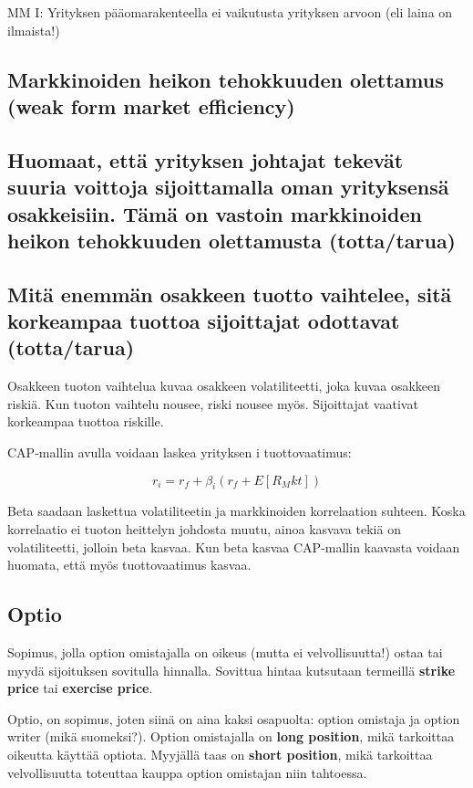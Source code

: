 \documentclass[a4paper]{article}
\begin{document}
MM I: Yrityksen pääomarakenteella ei vaikutusta yrityksen arvoon (eli laina on ilmaista!)



\subsection{Markkinoiden heikon tehokkuuden olettamus (weak form market efficiency)}

\subsection{Huomaat, että yrityksen johtajat tekevät suuria voittoja sijoittamalla oman yrityksensä osakkeisiin. Tämä on vastoin markkinoiden heikon tehokkuuden olettamusta (totta/tarua)}

\subsection{Mitä enemmän osakkeen tuotto vaihtelee, sitä korkeampaa tuottoa sijoittajat odottavat (totta/tarua)}

Osakkeen tuoton vaihtelua kuvaa osakkeen volatiliteetti, joka kuvaa osakkeen riskiä. Kun tuoton vaihtelu nousee, riski nousee myös. Sijoittajat vaativat korkeampaa tuottoa riskille.

CAP-mallin avulla voidaan laskea yrityksen i tuottovaatimus:

\[
    r_i = r_f + \beta_i (r_f + E[R_Mkt])
\]

Beta saadaan laskettua volatiliteetin ja markkinoiden korrelaation suhteen. Koska korrelaatio ei tuoton heittelyn johdosta muutu, ainoa kasvava tekiä on volatiliteetti, jolloin beta kasvaa. Kun beta kasvaa CAP-mallin kaavasta voidaan huomata, että myös tuottovaatimus kasvaa.

\subsection{Optio}

Sopimus, jolla option omistajalla on oikeus (mutta ei velvollisuutta!) ostaa tai myydä sijoituksen sovitulla hinnalla. Sovittua hintaa kutsutaan termeillä \textbf{strike price} tai \textbf{exercise price}.

Optio, on sopimus, joten siinä on aina kaksi osapuolta: option omistaja ja option writer (mikä suomeksi?). Option omistajalla on \textbf{long position}, mikä tarkoittaa oikeutta käyttää optiota. Myyjällä taas on \textbf{short position}, mikä tarkoittaa velvollisuutta toteuttaa kauppa option omistajan niin tahtoessa.
\end{document}
